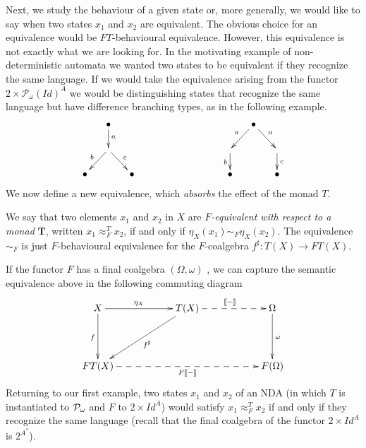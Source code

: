 \documentclass{LMCS}
\def\pow#1{{\mathcal P_\omega}#1}
\def\T{\mathbf{T}}
\newcommand{\bb}[1]{[\![ #1 ]\!]}
\begin{document}
Next, we study the behaviour of a given state or, more
generally, we would like to say when two states $x_1$ and $x_2$ are
equivalent. The obvious choice for an equivalence would be
$FT$-behavioural equivalence. However, this equivalence is not
exactly what we are looking for. In the motivating example of
non-deterministic automata we wanted two states to be equivalent if
they recognize the same language. If we would take the equivalence
arising from the functor $2\times \pow(\mathit{Id})^A$ we would be
distinguishing states that recognize the same language but have
difference branching types, as in the following example.
\[
\xymatrix@R=0.6cm@C=0.45cm{&\bullet \ar[d]^{a} &&\hspace{2cm} && \bullet \ar[dr]^{a}\ar[dl]_{a}\\
 &\ar[dr]^{c}\ar[dl]_{b}& && \ar[d]_{b}&&\ar[d]^{c}\\
 \bullet && \bullet &&\bullet&&\bullet }
\]
We now define a new equivalence, which {\em absorbs} the effect of the monad $T$.

We say that two elements $x_1$ and $x_2$ in $X$ are
\emph{$F$-equivalent with respect to a monad} $\T$, written $x_1
\approx_F^T x_2$, if and only if $\eta_X(x_1) \sim_F \eta_X(x_2)$.
The equivalence $\sim_F$ is just $F$-behavioural equivalence for the
$F$-coalgebra $f^\sharp \colon T(X) \to FT(X)$.

If the functor $F$ has a final coalgebra  $(\Omega, \omega)$ , we can capture the semantic equivalence above in the following commuting diagram
\begin{eqnarray}
\label{F-final}
\xymatrix@C=2cm@R=1.5cm{
X \ar[d]_{f}\ar[r]^-{\eta_X} & T(X)\ar[dl]^-{f^\sharp}\ar@{-->}[r]^{\bb{-}} & \Omega \ar[d]^{\omega}\\
FT(X)\ar@{-->}[rr]_-{F\bb{-}}  && F(\Omega)
}
\end{eqnarray}
Returning to our first example, two states $x_1$ and $x_2$ of an NDA (in
which $T$ is instantiated to $\pow$ and $F$ to
$2\times\mathit{Id}^A$) would satisfy $x_1\approx_F^T x_2$ if and
only if they recognize the same language (recall that the final
coalgebra of  the functor $2\times\mathit{Id}^A$ is $2^{A^*}$).
\end{document}
